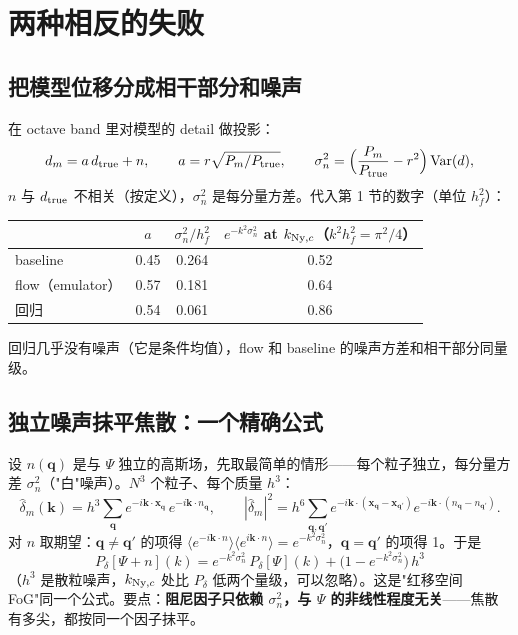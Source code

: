 \documentclass[11pt,UTF8,fontset=none]{ctexart}
\newcommand{\q}{\mathbf{q}}
\newcommand{\kk}{\mathbf{k}}
\newcommand{\x}{\mathbf{x}}
\newcommand{\Var}{\operatorname{Var}}
\newcommand{\Ny}{{\rm Ny}}
\newcommand{\Pd}{P_\delta}
\begin{document}
\section{两种相反的失败}

\subsection{把模型位移分成相干部分和噪声}

在 octave band 里对模型的 detail 做投影：
\begin{equation}
d_m=a\,d_{\rm true}+n,\qquad a=r\sqrt{P_m/P_{\rm true}},\qquad
\sigma_n^2=\Big(\frac{P_m}{P_{\rm true}}-r^2\Big)\Var(d),
\label{eq:split}
\end{equation}
$n$ 与 $d_{\rm true}$ 不相关（按定义），$\sigma_n^2$ 是每分量方差。代入第 1 节的数字（单位 $h_f^2$）：
\begin{center}
\begin{tabular}{lccc}
\toprule
 & $a$ & $\sigma_n^2/h_f^2$ & $e^{-k^2\sigma_n^2}$ at $k_{\Ny,c}$（$k^2h_f^2=\pi^2/4$）\\
\midrule
baseline & 0.45 & 0.264 & 0.52\\
flow（emulator） & 0.57 & 0.181 & 0.64\\
回归 & 0.54 & 0.061 & 0.86\\
\bottomrule
\end{tabular}
\end{center}
回归几乎没有噪声（它是条件均值），flow 和 baseline 的噪声方差和相干部分同量级。

\subsection{独立噪声抹平焦散：一个精确公式}

设 $n(\q)$ 是与 $\Psi$ 独立的高斯场，先取最简单的情形——每个粒子独立，每分量方差 $\sigma_n^2$（"白"噪声）。$N^3$ 个粒子、每个质量 $h^3$：
\begin{equation}
\hat\delta_m(\kk)=h^3\sum_{\q}e^{-i\kk\cdot\x_\q}\,e^{-i\kk\cdot n_\q},\qquad
|\hat\delta_m|^2=h^6\sum_{\q,\q'}e^{-i\kk\cdot(\x_\q-\x_{\q'})}e^{-i\kk\cdot(n_\q-n_{\q'})}.
\end{equation}
对 $n$ 取期望：$\q\ne\q'$ 的项得 $\langle e^{-i\kk\cdot n}\rangle\langle e^{i\kk\cdot n}\rangle=e^{-k^2\sigma_n^2}$，$\q=\q'$ 的项得 1。于是
\begin{equation}
\boxed{\;\Pd[\Psi+n](k)=e^{-k^2\sigma_n^2}\,\Pd[\Psi](k)+\big(1-e^{-k^2\sigma_n^2}\big)\,h^3\;}
\label{eq:smear}
\end{equation}
（$h^3$ 是散粒噪声，$k_{\Ny,c}$ 处比 $\Pd$ 低两个量级，可以忽略）。这是"红移空间 FoG"同一个公式。要点：\textbf{阻尼因子只依赖 $\sigma_n^2$，与 $\Psi$ 的非线性程度无关}——焦散有多尖，都按同一个因子抹平。
\end{document}
